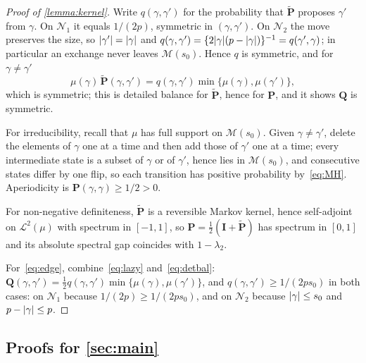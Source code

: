 \begin{proof}[Proof of \cref{lemma:kernel}]
    Write $q(\gamma,\gamma')$ for the probability that
    $\widetilde{\mathbf{P}}$ proposes $\gamma'$ from $\gamma$. On
    $\mathcal{N}_1$ it equals $1/(2p)$, symmetric in $(\gamma,\gamma')$.
    On $\mathcal{N}_2$ the move preserves the size, so
    $\lvert\gamma'\rvert=\lvert\gamma\rvert$ and $q(\gamma,\gamma')
    =\{2\lvert\gamma\rvert(p-\lvert\gamma\rvert)\}^{-1}=q(\gamma',\gamma)$; in particular
    an exchange never leaves $\mathscr{M}(s_0)$. Hence $q$ is symmetric,
    and for $\gamma\neq\gamma'$
    \begin{equation}
        \label{eq:detbal}
        \mu(\gamma)\,\widetilde{\mathbf{P}}(\gamma,\gamma')
        =q(\gamma,\gamma')\min\bigl\{\mu(\gamma),\mu(\gamma')\bigr\},
    \end{equation}
    which is symmetric; this is detailed balance for
    $\widetilde{\mathbf{P}}$, hence for $\mathbf{P}$, and
    it shows $\mathbf{Q}$ is symmetric.

    For irreducibility, recall that $\mu$ has full support on
    $\mathscr{M}(s_0)$. Given
    $\gamma\neq\gamma'$, delete the elements of $\gamma$ one at a time
    and then add those of $\gamma'$ one at a time; every intermediate
    state is a subset of $\gamma$ or of $\gamma'$, hence lies in
    $\mathscr{M}(s_0)$, and consecutive states differ by one flip, so
    each transition has positive probability by~\eqref{eq:MH}.
    Aperiodicity is $\mathbf{P}(\gamma,\gamma)\geq1/2>0$.

    For non-negative definiteness, $\widetilde{\mathbf{P}}$ is a
    reversible Markov kernel, hence self-adjoint on
    $\mathcal{L}^2(\mu)$ with spectrum in $[-1,1]$, so
    $\mathbf{P}=\tfrac12(\mathbf{I}+\widetilde{\mathbf{P}})$ has spectrum
    in $[0,1]$ and its absolute spectral gap coincides with $1-\lambda_2$.

    For~\eqref{eq:edge}, combine~\eqref{eq:lazy} and~\eqref{eq:detbal}:
    $\mathbf{Q}(\gamma,\gamma')=\tfrac12 q(\gamma,\gamma')
    \min\{\mu(\gamma),\mu(\gamma')\}$, and
    $q(\gamma,\gamma')\geq1/(2ps_0)$ in both cases: on $\mathcal{N}_1$
    because $1/(2p)\geq1/(2ps_0)$, and on $\mathcal{N}_2$ because
    $\lvert\gamma\rvert\leq s_0$ and $p-\lvert\gamma\rvert\leq p$.
\end{proof}

\subsection{Proofs for \cref{sec:main}}
\label{sub:appmain}

